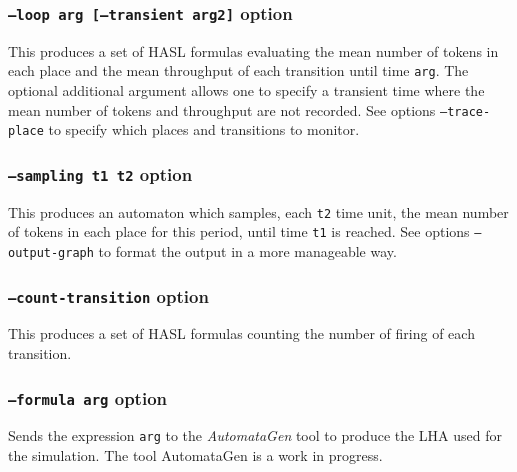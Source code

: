 \documentclass{article}
\begin{document}
\subsubsection{\texttt{--loop arg [--transient arg2]}  option}
This produces a set of HASL formulas evaluating the mean number of 
tokens in each place and the mean throughput of each transition until time
\texttt{arg}. The optional additional argument allows one to specify a transient
time where the mean number of tokens and throughput are not recorded.
See options \texttt{--trace-place} to specify which places and transitions 
to monitor.

\subsubsection{\texttt{--sampling t1 t2} option}
This produces an automaton which samples, each \texttt{t2} time unit, the
mean number of tokens in each place for this period, until time
\texttt{t1} is reached.  See options \texttt{--output-graph} to format
the output in a more manageable way.

\subsubsection{\texttt{--count-transition} option}
This produces a set of HASL formulas counting the number of firing of each
transition.

\subsubsection{\texttt{--formula arg} option}
Sends the expression \texttt{arg} to the \emph{AutomataGen} tool to produce
the LHA used for the simulation. The tool AutomataGen is a work in progress.
\end{document}
